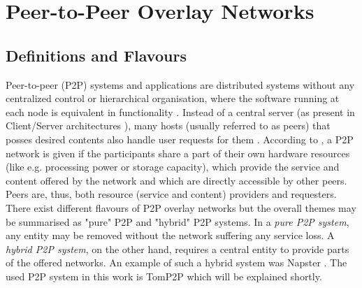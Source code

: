 \section{Peer-to-Peer Overlay Networks}
\subsection{Definitions and Flavours}
Peer-to-peer (P2P) systems and applications are distributed systems without any centralized control or hierarchical organisation, where the software running at each node is equivalent in functionality \cite{Stoica2001}. Instead of a central server (as present in Client/Server architectures \cite{Schollmeier:2001:DPN:882470.883282}), many hosts (usually referred to as peers) that posses desired contents also handle user requests for them \cite{Chawathe2003}. According to \cite{Schollmeier:2001:DPN:882470.883282}, a P2P network is given if the participants share a part of their own hardware resources (like e.g. processing power or storage capacity), which provide the service and content offered by the network and which are directly accessible by other peers. Peers are, thus, both resource (service  and content) providers and requesters. There exist different flavours of P2P overlay networks but the overall themes may be summarised as "pure" P2P and "hybrid" P2P systems. In a \textit{pure P2P system}, any entity may be removed without the network suffering any service loss. A \textit{hybrid P2P system}, on the other hand, requires a central entity to provide parts of the offered networks. An example of such a hybrid system was Napster \cite{Chawathe2003}. The used P2P system in this work is TomP2P which will be explained shortly.  

